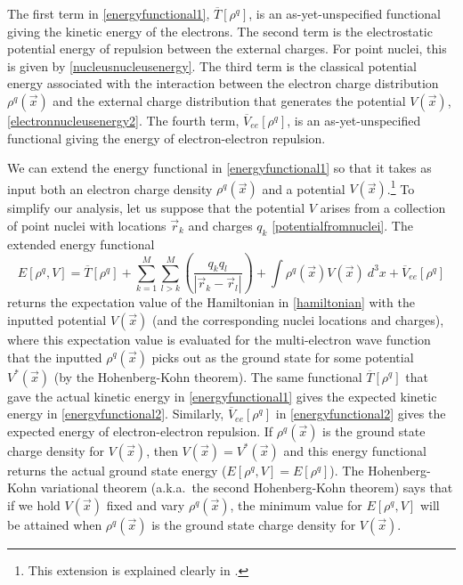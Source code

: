 \documentclass[onecolumn,secnumarabic,amsmath,amssymb,balancelastpage,nofootinbib]{article}
\begin{document}
The first term in \eqref{energyfunctional1}, $\overline{T}[\rho^q]$, is an as-yet-unspecified functional giving the kinetic energy of the electrons.  The second term is the electrostatic potential energy of repulsion between the external charges.  For point nuclei, this is given by \eqref{nucleusnucleusenergy}.  The third term is the classical potential energy associated with the interaction between the electron charge distribution $\rho^q(\vec{x})$ and the external charge distribution that generates the potential $V(\vec{x})$, \eqref{electronnucleusenergy2}.  The fourth term, $\overline{V}_{ee}[\rho^q]$, is an as-yet-unspecified functional giving the energy of electron-electron repulsion.

We can extend the energy functional in \eqref{energyfunctional1} so that it takes as input both an electron charge density $\rho^q(\vec{x})$ and a potential $V(\vec{x})$.\footnote{This extension is explained clearly in \cite[pg.\ 5384]{baerends1997}.}  To simplify our analysis, let us suppose that the potential $V$ arises from a collection of point nuclei with locations $\vec{r}_k$ and charges $q_k$ \eqref{potentialfromnuclei}.  The extended energy functional
\begin{equation}
E[\rho^q,V]=\overline{T}[\rho^q]+\sum_{k=1}^{M}\sum_{l>k}^{M} \left(\frac{q_k q_l}{|\vec{r}_k-\vec{r}_l|}\right)+\int{\rho^q(\vec{x}) V(\vec{x}) \  d^3 x}+\overline{V}_{ee}[\rho^q]
\label{energyfunctional2}
\end{equation}
returns the expectation value of the Hamiltonian in \eqref{hamiltonian} with the inputted potential $V(\vec{x})$ (and the corresponding nuclei locations and charges), where this expectation value is evaluated for the multi-electron wave function that the inputted $\rho^q(\vec{x})$ picks out as the ground state for some potential $V^*(\vec{x})$ (by the Hohenberg-Kohn theorem).  The same functional $\overline{T}[\rho^q]$ that gave the actual kinetic energy in \eqref{energyfunctional1} gives the expected kinetic energy in \eqref{energyfunctional2}.  Similarly, $\overline{V}_{ee}[\rho^q]$ in \eqref{energyfunctional2} gives the expected energy of electron-electron repulsion.  If $\rho^q(\vec{x})$ is the ground state charge density for $V(\vec{x})$, then $V(\vec{x})=V^*(\vec{x})$ and this energy functional returns the actual ground state energy ($E[\rho^q,V]=E[\rho^q]$).  The Hohenberg-Kohn variational theorem (a.k.a.\ the second Hohenberg-Kohn theorem) says that if we hold $V(\vec{x})$ fixed and vary $\rho^q(\vec{x})$, the minimum value for $E[\rho^q,V]$ will be attained when $\rho^q(\vec{x})$ is the ground state charge density for $V(\vec{x})$.
\end{document}
